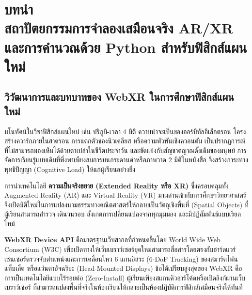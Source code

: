 \chapter*{บทนำ\\สถาปัตยกรรมการจำลองเสมือนจริง AR/XR และการคำนวณด้วย Python สำหรับฟิสิกส์แผนใหม่}
\label{chap:introduction}


\section*{วิวัฒนาการและบทบาทของ WebXR ในการศึกษาฟิสิกส์แผนใหม่}

มโนทัศน์ในวิชาฟิสิกส์แผนใหม่ เช่น ปริภูมิ-เวลา 4 มิติ ความน่าจะเป็นของออร์บิทัลอิเล็กตรอน โครงสร้างควาร์กภายในฮาดรอน การแตกตัวของนิวเคลียส หรือความพัวพันเชิงควอนตัม เป็นปรากฏการณ์ที่ไม่สามารถมองเห็นได้ด้วยตาเปล่าในชีวิตประจำวัน และขัดแย้งกับสัญชาตญาณดั้งเดิมของมนุษย์ การจัดการเรียนรู้แบบเดิมที่พึ่งพาเพียงสมการบนกระดานดำหรือภาพวาด 2 มิติในหนังสือ จึงสร้างภาระทางพุทธิปัญญา (Cognitive Load) ให้แก่ผู้เรียนอย่างยิ่ง

การนำเทคโนโลยี \textbf{ความเป็นจริงขยาย (Extended Reality หรือ XR)} ซึ่งครอบคลุมทั้ง Augmented Reality (AR) และ Virtual Reality (VR) มาผสานเข้ากับการศึกษาวิทยาศาสตร์ จึงเปิดมิติใหม่ในการแปลงนามธรรมทางคณิตศาสตร์ให้กลายเป็นวัตถุเชิงพื้นที่ (Spatial Objects) ที่ผู้เรียนสามารถสำรวจ เดินวนรอบ สังเกตการเปลี่ยนแปลงจากทุกมุมมอง และมีปฏิสัมพันธ์แบบเรียลไทม์

\textbf{WebXR Device API} คือมาตรฐานเว็บสากลที่กำหนดขึ้นโดย World Wide Web Consortium (W3C) เพื่อเปิดทางให้เว็บเบราว์เซอร์ยุคใหม่สามารถสื่อสารโดยตรงกับฮาร์ดแวร์เซนเซอร์ตรวจจับตำแหน่งและการเคลื่อนไหว 6 แกนอิสระ (6-DoF Tracking) ของสมาร์ตโฟน แท็บเล็ต หรือแว่นตาอัจฉริยะ (Head-Mounted Displays) ข้อได้เปรียบสูงสุดของ WebXR คือการเป็นเทคโนโลยีแบบไร้รอยต่อ (Zero-Install) ผู้เรียนเพียงสแกนคิวอาร์โค้ดหรือเปิดลิงก์ผ่านเว็บเบราว์เซอร์ ก็สามารถแปลงพื้นที่จริงในห้องเรียนให้กลายเป็นห้องปฏิบัติการฟิสิกส์เสมือนจริงได้ทันที

